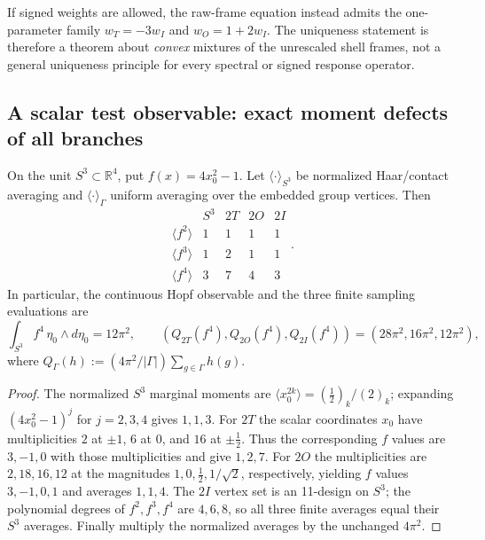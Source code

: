 \documentclass[11pt]{article}
\begin{document}
\begin{remark}
If signed weights are allowed, the raw-frame equation instead admits
the one-parameter family $w_T=-3w_I$ and $w_O=1+2w_I$.
The uniqueness statement is therefore a theorem about \emph{convex}
mixtures of the unrescaled shell frames, not a general uniqueness
principle for every spectral or signed response operator.
\end{remark}

\subsection{A scalar test observable: exact moment defects of all branches}
\label{p1b:subsec:v11-moment-comparison}

\begin{proposition}[Complete $f=4x_0^2-1$ moment comparison]
\label{p1b:prop:v11-scalar-moment-comparison}
On the unit $S^3\subset\mathbb R^4$, put $f(x)=4x_0^2-1$.
Let $\langle\cdot\rangle_{S^3}$ be normalized Haar/contact
averaging and $\langle\cdot\rangle_\Gamma$ uniform averaging over
the embedded group vertices.  Then
\[
\begin{array}{c|c|c|c|c}
 &S^3&2T&2O&2I\\\hline
\langle f^2\rangle&1&1&1&1\\
\langle f^3\rangle&1&2&1&1\\
\langle f^4\rangle&3&7&4&3
\end{array}.
\]
In particular, the continuous Hopf observable and the three finite
sampling evaluations are
\[
\int_{S^3}f^4\,\eta_0\wedge d\eta_0=12\pi^2,
\qquad
\boxed{(Q_{2T}(f^4),Q_{2O}(f^4),Q_{2I}(f^4))
 =(28\pi^2,16\pi^2,12\pi^2),}
\]
where $Q_\Gamma(h):=(4\pi^2/|\Gamma|)\sum_{g\in\Gamma}h(g)$.
\end{proposition}
\begin{proof}
The normalized $S^3$ marginal moments are
$\langle x_0^{2k}\rangle=(\frac12)_k/(2)_k$; expanding
$(4x_0^2-1)^j$ for $j=2,3,4$ gives $1,1,3$.
For $2T$ the scalar coordinates $x_0$ have multiplicities
$2$ at $\pm1$, $6$ at $0$, and $16$ at $\pm\frac12$.
Thus the corresponding $f$ values are $3,-1,0$ with those
multiplicities and give $1,2,7$.  For $2O$ the multiplicities
are $2,18,16,12$ at the magnitudes
$1,0,\frac12,1/\sqrt2$, respectively, yielding $f$ values
$3,-1,0,1$ and averages $1,1,4$.  The $2I$ vertex set is an
11-design on $S^3$; the polynomial degrees of $f^2,f^3,f^4$ are
$4,6,8$, so all three finite averages equal their $S^3$ averages.
Finally multiply the normalized averages by the unchanged $4\pi^2$.
\end{proof}
\end{document}
